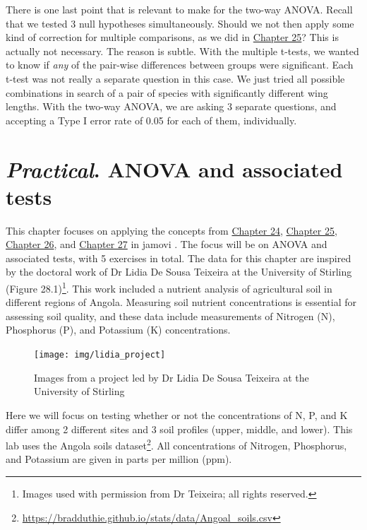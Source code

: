 \documentclass[
]{scrbook}
\begin{document}
There is one last point that is relevant to make for the two-way ANOVA.
Recall that we tested 3 null hypotheses simultaneously.
Should we not then apply some kind of correction for multiple comparisons, as we did in \protect\hyperlink{Chapter_25}{Chapter 25}?
This is actually not necessary.
The reason is subtle.
With the multiple t-tests, we wanted to know if \emph{any} of the pair-wise differences between groups were significant.
Each t-test was not really a separate question in this case.
We just tried all possible combinations in search of a pair of species with significantly different wing lengths.
With the two-way ANOVA, we are asking 3 separate questions, and accepting a Type I error rate of 0.05 for each of them, individually.

\hypertarget{Chapter_28}{%
\chapter{\texorpdfstring{\emph{Practical}. ANOVA and associated tests}{Practical. ANOVA and associated tests}}\label{Chapter_28}}

This chapter focuses on applying the concepts from \protect\hyperlink{Chapter_24}{Chapter 24}, \protect\hyperlink{Chapter_25}{Chapter 25}, \protect\hyperlink{Chapter_26}{Chapter 26}, and \protect\hyperlink{Chapter_27}{Chapter 27} in jamovi \citep{Jamovi2022}.
The focus will be on ANOVA and associated tests, with 5 exercises in total.
The data for this chapter are inspired by the doctoral work of Dr Lidia De Sousa Teixeira at the University of Stirling (Figure 28.1)\footnote{Images used with permission from Dr Teixeira; all rights reserved.}.
This work included a nutrient analysis of agricultural soil in different regions of Angola.
Measuring soil nutrient concentrations is essential for assessing soil quality, and these data include measurements of Nitrogen (N), Phosphorus (P), and Potassium (K) concentrations.

\begin{figure}
\texttt{[image: img/lidia\_project]} \caption{Images from a project led by Dr Lidia De Sousa Teixeira at the University of Stirling}\label{fig:unnamed-chunk-127}
\end{figure}

Here we will focus on testing whether or not the concentrations of N, P, and K differ among 2 different sites and 3 soil profiles (upper, middle, and lower).
This lab uses the Angola soils dataset\footnote{\href{https://bradduthie.github.io/stats/data/Angola_soils.csv}{https://bradduthie.github.io/stats/data/Angoal\_soils.csv}}.
All concentrations of Nitrogen, Phosphorus, and Potassium are given in parts per million (ppm).
\end{document}
